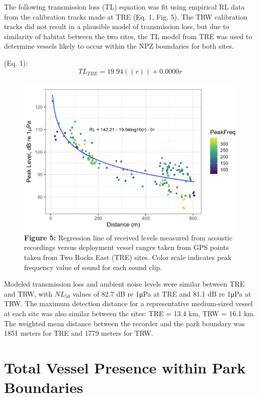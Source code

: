 \documentclass[
  letterpaper,
  oneside,
  open=any]{scrbook}
\begin{document}
The following transmission loss (TL) equation was fit using empirical RL
data from the calibration tracks made at TRE (Eq. 1, Fig. 5). The TRW
calibration tracks did not result in a plausible model of transmission
loss, but due to similarity of habitat between the two sites, the TL
model from TRE was used to determine vessels likely to occur within the
NPZ boundaries for both sites.

(Eq. 1): \[
TL_{TRE} = 19.94((r)) + 0.0000r
\]

\begin{figure}[H]

{\centering \includegraphics{images/Figure.5.PNG}

}

\caption{\textbf{Figure 5:} Regression line of received levels measured
from acoustic recordings versus deployment vessel ranges taken from GPS
points taken from Two Rocks East (TRE) sites. Color scale indicates peak
frequency value of sound for each sound clip.}

\end{figure}%

Modeled transmission loss and ambient noise levels were similar between
TRE and TRW, with \(NL_{50}\) values of 82.7 dB re 1μPa at TRE and 81.1
dB re 1μPa at TRW. The maximum detection distance for a representative
medium-sized vessel at each site was also similar between the sites: TRE
= 13.4 km, TRW = 16.1 km. The weighted mean distance between the
recorder and the park boundary was 1851 meters for TRE and 1779 meters
for TRW.

\section{Total Vessel Presence within Park
Boundaries}\label{total-vessel-presence-within-park-boundaries}
\end{document}
